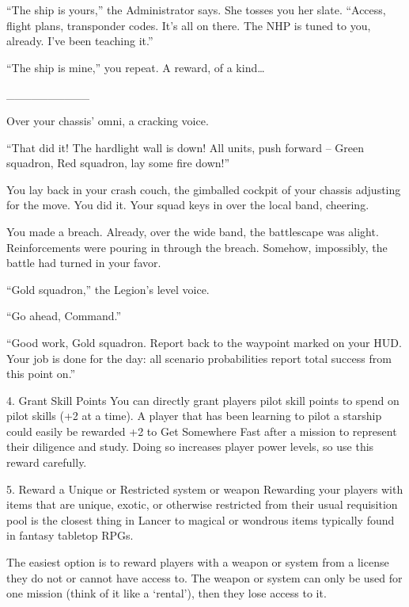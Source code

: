 “The ship is yours,” the Administrator says. She tosses you her slate. “Access, flight plans,  
transponder codes. It’s all on there. The NHP is tuned to you, already. I’ve been teaching it.”   

“The ship is mine,” you repeat. A reward, of a kind…  

\_\_\_\_\_\_\_\_\_\_
 

Over your chassis’ omni, a cracking voice.  

“That did it! The hardlight wall is down! All units, push forward -- Green squadron, Red squadron,  
lay some fire down!”   

                                                                                                              


You lay back in your crash couch, the gimballed cockpit of your chassis adjusting for the move.  
You did it. Your squad keys in over the local band, cheering.   

You made a breach. Already, over the wide band, the battlescape was alight. Reinforcements  
were pouring in through the breach. Somehow, impossibly, the battle had turned in your favor.   

“Gold squadron,” the Legion’s level voice.   

“Go ahead, Command.”  

“Good work, Gold squadron. Report back to the waypoint marked on your HUD. Your job is done  
for the day: all scenario probabilities report total success from this point on.”    
 

4. Grant Skill Points  
You can directly grant players pilot skill points to spend on pilot skills (+2 at a time). A player that  
has been learning to pilot a starship could easily be rewarded +2 to Get Somewhere Fast after a  
mission to represent their diligence and study. Doing so increases player power levels, so use  
this reward carefully.
 

5. Reward a Unique or Restricted system or weapon  
Rewarding your players with items that are unique, exotic, or otherwise restricted from their usual  
requisition pool is the closest thing in Lancer to magical or wondrous items typically found in  
fantasy tabletop RPGs. 
 

The easiest option is to reward players with a weapon or system from a license they do not  
or cannot have access to. The weapon or system can only be used for one mission (think of it  
like a ‘rental’), then they lose access to it. 
 

